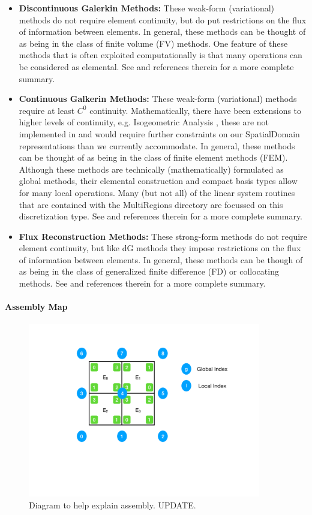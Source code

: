 \begin{itemize}
\item {\bf Discontinuous Galerkin Methods:} These weak-form (variational) methods do not require element continuity, but do put restrictions on the flux of information between elements.  In general, these methods can be thought of as being in the class of finite volume (FV) methods.  One feature of these methods that is often exploited computationally is that
many operations can be considered as elemental.   See \cite{CockburnKS,HesthavenW08} and references therein for a more complete summary.
%
\item {\bf Continuous Galkerin Methods:}  These weak-form (variational) methods require at least $C^0$ continuity.  Mathematically, there have been extensions to 
higher levels of continuity, e.g. Isogeometric Analysis  \cite{CottrellISO}, these are not implemented in {\nek} and would require further constraints on our SpatialDomain
representations than we currently accommodate.  In general, these methods can be thought of as being in the class of finite element methods (FEM).  Although 
these methods are technically (mathematically) formulated as global methods, their elemental construction and compact basis types allow for many local operations.
Many (but not all) of the linear system routines that are contained with the MultiRegions directory are focussed on this discretization type.
See \cite{Schwab, DevilleFM02,KaSh05}  and references therein for a more complete summary.
%
\item {\bf Flux Reconstruction Methods:}  These strong-form methods do not require element continuity, but like dG methods they impose restrictions on the flux of information between elements.  In general, these methods can be though of as being in the class of generalized finite difference (FD) or collocating methods. 
See  \cite{Kopriva,WitherdenVJ2016} and references therein for a more complete summary.
\end{itemize}

\paragraph{Assembly Map}



\begin{figure}[htb]
\centering
\includegraphics[width=4in]{img/Assembly1.pdf}
\caption{Diagram to help explain assembly.  UPDATE.}
\label{multiregions:assembly1}
\end{figure}


